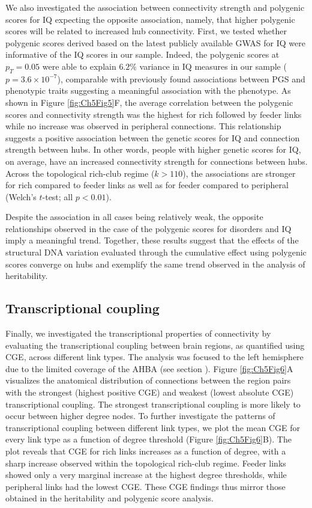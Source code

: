 We also investigated the association between connectivity strength and polygenic scores for IQ expecting the opposite association, namely, that higher polygenic scores will be related to increased hub connectivity. First, we tested whether polygenic scores derived based on the latest publicly available GWAS for IQ \citep{Savage2018} were informative of the IQ scores in our sample. Indeed, the polygenic scores at $p_{T} = 0.05$ were able to explain $6.2\%$ variance in IQ measures in our sample ($p = 3.6 \times 10^{-7}$), comparable with previously found associations between PGS and phenotypic traits \citep{Euesden2015} suggesting a meaningful association with the phenotype. As shown in Figure \ref{fig:Ch5Fig5}F, the average correlation between the polygenic scores and connectivity strength was the highest for rich followed by feeder links while no increase was observed in peripheral connections. This relationship suggests a positive association between the genetic scores for IQ and connection strength between hubs. In other words, people with higher genetic scores for IQ, on average, have an increased connectivity strength for connections between hubs. Across the topological rich-club regime ($k > 110$), the associations are stronger for rich compared to feeder links as well as for feeder compared to peripheral (Welch's $t$-test; all $p<0.01$).


Despite the association in all cases being relatively weak, the opposite relationships observed in the case of the polygenic scores for disorders and IQ imply a meaningful trend. Together, these results suggest that the effects of the structural DNA variation evaluated through the cumulative effect using polygenic scores converge on hubs and exemplify the same trend observed in the analysis of heritability.

\subsection{Transcriptional coupling}

Finally, we investigated the transcriptional properties of connectivity by evaluating the transcriptional coupling between brain regions, as quantified using CGE, across different link types. The analysis was focused to the left hemisphere due to the limited coverage of the AHBA (see section ). Figure \ref{fig:Ch5Fig6}A visualizes the anatomical distribution of connections between the region pairs with the strongest (highest positive CGE) and weakest (lowest absolute CGE) transcriptional coupling. The strongest transcriptional coupling is more likely to occur between higher degree nodes. To further investigate the patterns of transcriptional coupling between different link types, we plot the mean CGE for every link type as a function of degree threshold (Figure \ref{fig:Ch5Fig6}B). The plot reveals that CGE for rich links increases as a function of degree, with a sharp increase observed within the topological rich-club regime. Feeder links showed only a very marginal increase at the highest degree thresholds, while peripheral links had the lowest CGE. These CGE findings thus mirror those obtained in the heritability and polygenic score analysis.

